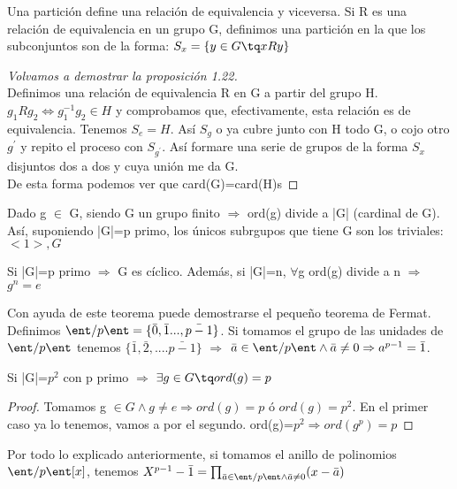 \documentclass[a4paper,10pt]{apuntes}
\begin{document}
  Una partición define una relación de equivalencia y viceversa. Si R es una relación de equivalencia en un grupo G, 
  definimos una partición en la que los subconjuntos son de la forma: $S_{x}=\{y\in G \tq xRy\}$
  
  \begin{proof}[Volvamos a demostrar la proposición 1.22]
   \\Definimos una relación de equivalencia R en G a partir del grupo H.
   $g_{1}Rg_{2} \Leftrightarrow g_{1}^{-1}g_{2}\in H$  y comprobamos que, efectivamente, esta relación es de equivalencia.
   Tenemos $S_{e}=H$. Así $S_{g}$  o ya cubre junto con H todo G, o cojo otro $g^{'}$  y repito el proceso con $S_{g^{'}}$.
   Así formare una serie de grupos de la forma $S_{x}$  disjuntos dos a dos y cuya unión me da G.\\
   De esta forma podemos ver que card(G)=card(H)\ast s
  \end{proof}
  
  \begin{corol}
   Dado g $\in$ G, siendo G un grupo finito $\Rightarrow$  ord(g) divide a |G| (cardinal de G). Así, suponiendo |G|=p primo,
   los únicos subrgupos que tiene G son los triviales: $<1>, G$
  \end{corol}
  \begin{theorem}
   Si |G|=p primo $\Rightarrow$  G es cíclico. Además, si |G|=n, $\forall$g ord(g) divide a n $\Rightarrow$  $g^{n}=e$
  \end{theorem}
  \begin{example}
   Con ayuda de este teorema puede demostrarse el pequeño teorema de Fermat. 
   Definimos $\ent/p\ent=\{\bar{0},\bar{1}...,\bar{p-1}\}$.
   Si tomamos el grupo de las unidades de $\ent/p\ent$ tenemos $\{\bar{1}, \bar{2},....\bar{p-1}\}$ $\Rightarrow$
   $\bar{a}\in\ent/p\ent \wedge \bar{a}\neq 0 \Rightarrow a^{p-1}=\bar{1}$.
  \end{example}
  \begin{theorem}
   Si |G|=$p^{2}$  con p primo $\Rightarrow$  $\exists g \in G \tq ord(g)=p$
  \end{theorem}
  \begin{proof}
   Tomamos g $\in G \wedge g\neq e \Rightarrow ord(g)=p$  ó $ord(g)=p^{2}$. En el primer caso ya lo tenemos, vamos a por el segundo.
   ord(g)=$p^{2}\Rightarrow ord(g^{p})=p$
  \end{proof}
  \begin{example}
   Por todo lo explicado anteriormente, si tomamos el anillo de polinomios $\ent/p\ent[x]$, tenemos $X^{p-1}-\bar{1}=
   \prod_{\bar{a}\in\ent/p\ent \wedge \bar{a}\neq 0}(x-\bar{a})$
  \end{example}
  
\end{document}
